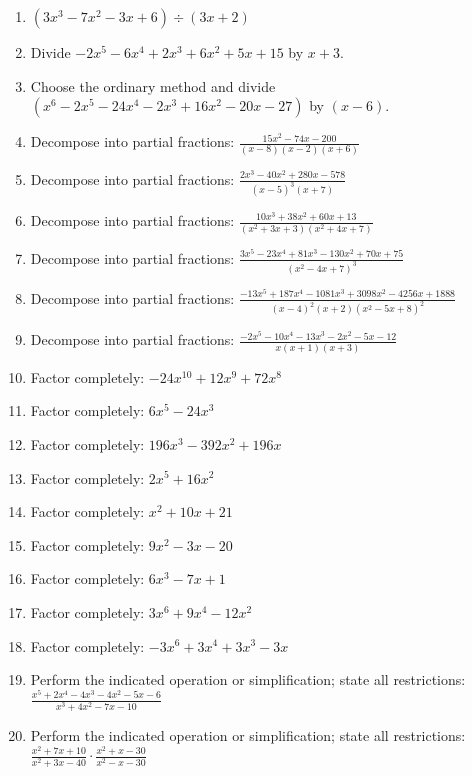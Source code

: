 \documentclass[11pt,oneside]{book}
\begin{document}
\begin{enumerate}[leftmargin=*,label=\textbf{\arabic*.},itemsep=0.65\baselineskip]
\item $\displaystyle (3 x^{3} - 7 x^{2} - 3 x + 6)\div(3 x + 2)$
\item Divide $ - 2 x^{5} - 6 x^{4} + 2 x^{3} + 6 x^{2} + 5 x + 15 $ by $x + 3$.
\item Choose the ordinary method and divide $(x^{6} - 2 x^{5} - 24 x^{4} - 2 x^{3} + 16 x^{2} - 20 x - 27)$ by $(x - 6)$.
\item Decompose into partial fractions: $\displaystyle \frac{15 x^{2} - 74 x - 200}{\left(x - 8\right) \left(x - 2\right) \left(x + 6\right)}$
\item Decompose into partial fractions: $\displaystyle \frac{2 x^{3} - 40 x^{2} + 280 x - 578}{\left(x - 5\right)^{3} \left(x + 7\right)}$
\item Decompose into partial fractions: $\displaystyle \frac{10 x^{3} + 38 x^{2} + 60 x + 13}{\left(x^{2} + 3 x + 3\right) \left(x^{2} + 4 x + 7\right)}$
\item Decompose into partial fractions: $\displaystyle \frac{3 x^{5} - 23 x^{4} + 81 x^{3} - 130 x^{2} + 70 x + 75}{\left(x^{2} - 4 x + 7\right)^{3}}$
\item Decompose into partial fractions: $\displaystyle \frac{- 13 x^{5} + 187 x^{4} - 1081 x^{3} + 3098 x^{2} - 4256 x + 1888}{\left(x - 4\right)^{2} \left(x + 2\right) \left(x^{2} - 5 x + 8\right)^{2}}$
\item Decompose into partial fractions: $\displaystyle \frac{- 2 x^{5} - 10 x^{4} - 13 x^{3} - 2 x^{2} - 5 x - 12}{x \left(x + 1\right) \left(x + 3\right)}$
\item Factor completely: $ - 24 x^{10} + 12 x^{9} + 72 x^{8} $
\item Factor completely: $ 6 x^{5} - 24 x^{3} $
\item Factor completely: $ 196 x^{3} - 392 x^{2} + 196 x $
\item Factor completely: $ 2 x^{5} + 16 x^{2} $
\item Factor completely: $ x^{2} + 10 x + 21 $
\item Factor completely: $ 9 x^{2} - 3 x - 20 $
\item Factor completely: $ 6 x^{3} - 7 x + 1 $
\item Factor completely: $ 3 x^{6} + 9 x^{4} - 12 x^{2} $
\item Factor completely: $ - 3 x^{6} + 3 x^{4} + 3 x^{3} - 3 x $
\item Perform the indicated operation or simplification; state all restrictions: $\displaystyle \frac{x^{5} + 2 x^{4} - 4 x^{3} - 4 x^{2} - 5 x - 6}{x^{3} + 4 x^{2} - 7 x - 10}$
\item Perform the indicated operation or simplification; state all restrictions: $\displaystyle \frac{x^{2} + 7 x + 10}{x^{2} + 3 x - 40}\cdot\frac{x^{2} + x - 30}{x^{2} - x - 30}$
\end{enumerate}
\end{document}

